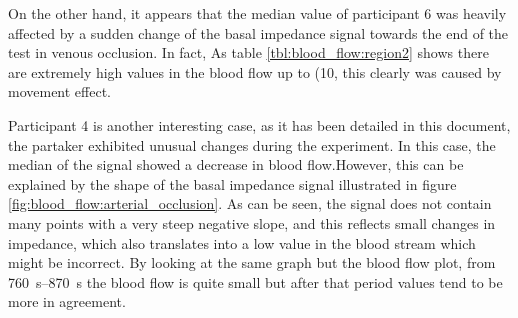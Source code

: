On the other hand, it appears that the median value of participant 6 was heavily affected by a sudden change of the basal impedance signal towards the end of the test in venous occlusion. In fact, As table \ref{tbl:blood_flow:region2} shows there are extremely high values in the blood flow up to (\SI{10}{\bfv}, this clearly was caused by movement effect. 

Participant 4 is another interesting case, as it has been detailed in this document, the partaker exhibited unusual changes during the experiment. In this case, the median of the signal showed a decrease in blood flow.However, this can be explained by the shape of the basal impedance signal illustrated in figure \ref{fig:blood_flow:arterial_occlusion}. As can be seen, the signal does not contain many points with a very steep negative slope, and this reflects small changes in impedance, which also translates into a low value in the blood stream which might be incorrect. By looking at the same graph but the blood flow plot, from \SIrange{760}{870}{\second} the blood flow is quite small but after that period values tend to be more in agreement.

